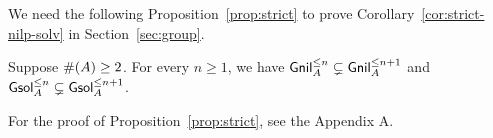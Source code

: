 


We need the following Proposition~\ref{prop:strict} to prove Corollary~\ref{cor:strict-nilp-solv} in Section~\ref{sec:group}.
\begin{proposition}\label{prop:strict}
  Suppose \(\#\!\left(A\right) \geq 2\).
  For every \(n \geq 1\), we have \(\mathsf{Gnil}_A^{\leq n} \subsetneq \mathsf{Gnil}_A^{\leq n + 1}\) and \(\mathsf{Gsol}_A^{\leq n} \subsetneq \mathsf{Gsol}_A^{\leq n + 1}\).
\end{proposition}
For the proof of Proposition~\ref{prop:strict}, see the Appendix A.

